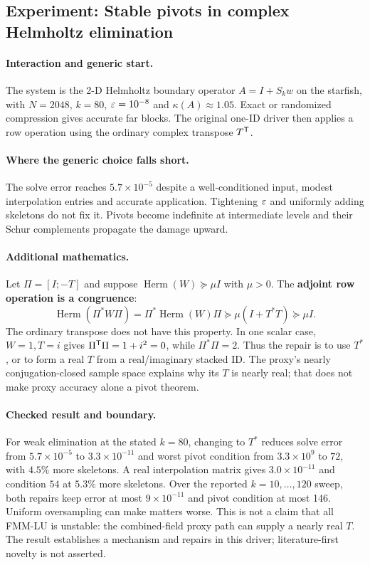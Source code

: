 \subsection{Experiment: Stable pivots in complex Helmholtz elimination}
\label{exp:e5}
\paragraph{Interaction and generic start.} The system is the 2-D Helmholtz boundary operator $A=I+S_kw$ on the starfish, with $N=2048$, $k=80$, $\varepsilon=10^{-8}$ and $\kappa(A)\approx1.05$. Exact or randomized compression gives accurate far blocks. The original one-ID driver then applies a row operation using the ordinary complex transpose $T^{\mathsf{T}}$.

\paragraph{Where the generic choice falls short.} The solve error reaches $5.7\times10^{-5}$ despite a well-conditioned input, modest interpolation entries and accurate application. Tightening $\varepsilon$ and uniformly adding skeletons do not fix it. Pivots become indefinite at intermediate levels and their Schur complements propagate the damage upward.

\paragraph{Additional mathematics.} Let $\Pi=[I;-T]$ and suppose $\operatorname{Herm}(W)\succeq\mu I$ with $\mu>0$. The \textbf{adjoint row operation is a congruence}:
\begin{equation}
 \operatorname{Herm}(\Pi^*W\Pi)
 =\Pi^*\operatorname{Herm}(W)\Pi
 \succeq \mu(I+T^*T)\succeq\mu I.
 \label{eq:e5-congruence}
\end{equation}
The ordinary transpose does not have this property. In one scalar case, $W=1,T=i$ gives $\Pi^{\mathsf{T}}\Pi=1+i^2=0$, while $\Pi^*\Pi=2$. Thus the repair is to use $T^*$, or to form a real $T$ from a real/imaginary stacked ID. The proxy's nearly conjugation-closed sample space explains why its $T$ is nearly real; that does not make proxy accuracy alone a pivot theorem.

\paragraph{Checked result and boundary.} For weak elimination at the stated $k=80$, changing to $T^*$ reduces solve error from $5.7\times10^{-5}$ to $3.3\times10^{-11}$ and worst pivot condition from $3.3\times10^9$ to $72$, with $4.5\%$ more skeletons. A real interpolation matrix gives $3.0\times10^{-11}$ and condition $54$ at $5.3\%$ more skeletons. Over the reported $k=10,\ldots,120$ sweep, both repairs keep error at most $9\times10^{-11}$ and pivot condition at most 146. Uniform oversampling can make matters worse. This is not a claim that all FMM-LU is unstable: the combined-field proxy path can supply a nearly real $T$. The result establishes a mechanism and repairs in this driver; literature-first novelty is not asserted.

